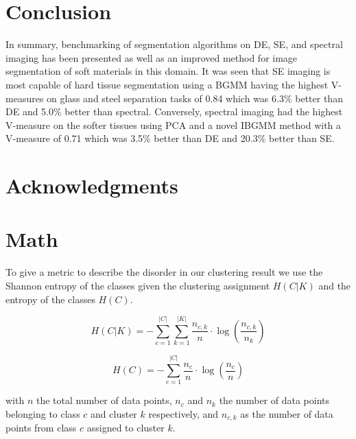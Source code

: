 \documentclass[a4paper,11pt]{article}
\begin{document}
\section{Conclusion}

In summary, benchmarking of segmentation algorithms on DE, SE, and spectral imaging has been presented as well as an improved method for image segmentation of soft materials in this domain. It was seen that SE imaging is most capable of hard tissue segmentation using a BGMM having the highest V-measures on glass and steel separation tasks of 0.84 which was 6.3\% better than DE and 5.0\% better than spectral. Conversely, spectral imaging had the highest V-measure on the softer tissues using PCA and a novel IBGMM method with a V-measure of 0.71 which was 3.5\% better than DE and 20.3\% better than SE.


\section*{Acknowledgments}

\appendix{}
\section{Math}

To give a metric to describe the disorder in our clustering result we use the Shannon entropy of the classes given the clustering assignment $H(C|K)$ and the entropy of the classes  $H(C)$.

\begin{equation}
H(C|K) = - \sum_{c=1}^{|C|} \sum_{k=1}^{|K|} \frac{n_{c,k}}{n}
\cdot \log\left(\frac{n_{c,k}}{n_k}\right)
\end{equation}

\begin{equation}
H(C) = - \sum_{c=1}^{|C|} \frac{n_c}{n} \cdot \log\left(\frac{n_c}{n}\right)
\end{equation}

with $n$ the total number of data points, $n_c$ and $n_k$ the number of data points belonging to class $c$ and cluster $k$ respectively, and $n_{c,k}$ as the number of data points from class $c$ assigned to cluster $k$.
\end{document}
